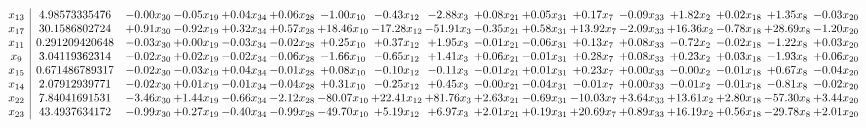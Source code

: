 \documentclass[9pt]{article}
\begin{document}
 \[\begin{array}{c| c c@{\hskip 2pt} c@{\hskip 2pt} c@{\hskip 2pt} c@{\hskip 2pt} c@{\hskip 2pt} c@{\hskip 2pt} c@{\hskip 2pt} c@{\hskip 2pt} c@{\hskip 2pt} c@{\hskip 2pt} c@{\hskip 2pt} c@{\hskip 2pt} c@{\hskip 2pt} c@{\hskip 2pt} c@{\hskip 2pt} }
 x_{13}   &  4.98573335476 & -0.00 x_{30} & -0.05 x_{19} & +  0.04 x_{34} & +  0.06 x_{28} & -1.00 x_{10} & -0.43 x_{12} & -2.88 x_{3} & +  0.08 x_{21} & +  0.05 x_{31} & +  0.17 x_{7} & -0.09 x_{33} & +  1.82 x_{2} & +  0.02 x_{18} & +  1.35 x_{8} & -0.03 x_{20}\\
 x_{17}   &  30.1586802724 & +  0.91 x_{30} & -0.92 x_{19} & +  0.32 x_{34} & +  0.57 x_{28} & + 18.46 x_{10} & -17.28 x_{12} & -51.91 x_{3} & -0.35 x_{21} & +  0.58 x_{31} & + 13.92 x_{7} & -2.09 x_{33} & + 16.36 x_{2} & -0.78 x_{18} & + 28.69 x_{8} & -1.20 x_{20}\\
 x_{11}   &  0.291209420648 & -0.03 x_{30} & +  0.00 x_{19} & -0.03 x_{34} & -0.02 x_{28} & +  0.25 x_{10} & +  0.37 x_{12} & +  1.95 x_{3} & -0.01 x_{21} & -0.06 x_{31} & +  0.13 x_{7} & +  0.08 x_{33} & -0.72 x_{2} & -0.02 x_{18} & -1.22 x_{8} & +  0.03 x_{20}\\
 x_{9}   &  3.04119362314 & -0.02 x_{30} & +  0.02 x_{19} & -0.02 x_{34} & -0.06 x_{28} & -1.66 x_{10} & -0.65 x_{12} & +  1.41 x_{3} & +  0.06 x_{21} & -0.01 x_{31} & +  0.28 x_{7} & +  0.08 x_{33} & +  0.23 x_{2} & +  0.03 x_{18} & -1.93 x_{8} & +  0.06 x_{20}\\
 x_{15}   &  0.671486789317 & -0.02 x_{30} & -0.03 x_{19} & +  0.04 x_{34} & -0.01 x_{28} & +  0.08 x_{10} & -0.10 x_{12} & -0.11 x_{3} & -0.01 x_{21} & +  0.01 x_{31} & +  0.23 x_{7} & +  0.00 x_{33} & -0.00 x_{2} & -0.01 x_{18} & +  0.67 x_{8} & -0.04 x_{20}\\
 x_{14}   &  2.07912939771 & -0.02 x_{30} & +  0.01 x_{19} & -0.01 x_{34} & -0.04 x_{28} & +  0.31 x_{10} & -0.25 x_{12} & +  0.45 x_{3} & -0.00 x_{21} & -0.04 x_{31} & -0.01 x_{7} & +  0.00 x_{33} & -0.01 x_{2} & -0.01 x_{18} & -0.81 x_{8} & -0.02 x_{20}\\
 x_{22}   &  7.84041691531 & -3.46 x_{30} & +  1.44 x_{19} & -0.66 x_{34} & -2.12 x_{28} & -80.07 x_{10} & + 22.41 x_{12} & + 81.76 x_{3} & +  2.63 x_{21} & -0.69 x_{31} & -10.03 x_{7} & +  3.64 x_{33} & + 13.61 x_{2} & +  2.80 x_{18} & -57.30 x_{8} & +  3.44 x_{20}\\
 x_{23}   &  43.4937634172 & -0.99 x_{30} & +  0.27 x_{19} & -0.40 x_{34} & -0.99 x_{28} & -49.70 x_{10} & +  5.19 x_{12} & +  6.97 x_{3} & +  2.01 x_{21} & +  0.19 x_{31} & + 20.69 x_{7} & +  0.89 x_{33} & + 16.19 x_{2} & +  0.56 x_{18} & -29.78 x_{8} & +  2.01 x_{20}\\

\end{array}\]
\end{document}
